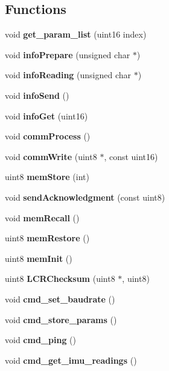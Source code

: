\subsection*{Functions}
\begin{DoxyCompactItemize}
\item 
\mbox{\label{command__processing_8h_a5ef086c932682ca5f7549b74ead732aa}} 
void {\bfseries get\+\_\+param\+\_\+list} (uint16 index)
\item 
\mbox{\label{command__processing_8h_a6fda7bc0be24d261f9cb09e77616b1be}} 
void {\bfseries info\+Prepare} (unsigned char $\ast$)
\item 
\mbox{\label{command__processing_8h_a065ff61e3097bf916aea076a8decb92b}} 
void {\bfseries info\+Reading} (unsigned char $\ast$)
\item 
\mbox{\label{command__processing_8h_af5dcf9e6d2a6421fbe636487e7f9f240}} 
void {\bfseries info\+Send} ()
\item 
\mbox{\label{command__processing_8h_a813734e69ea461791f84bddee422013f}} 
void {\bfseries info\+Get} (uint16)
\item 
\mbox{\label{command__processing_8h_a2e5d1711e19837adc3e8f479af3ae509}} 
void {\bfseries comm\+Process} ()
\item 
\mbox{\label{command__processing_8h_adeaad7a3965fdcfe78aa89533f1ebf39}} 
void {\bfseries comm\+Write} (uint8 $\ast$, const uint16)
\item 
uint8 \textbf{ mem\+Store} (int)
\item 
\mbox{\label{command__processing_8h_afe5c87f9df9bb965976b5d40c4159f1f}} 
void {\bfseries send\+Acknowledgment} (const uint8)
\item 
void \textbf{ mem\+Recall} ()
\item 
uint8 \textbf{ mem\+Restore} ()
\item 
uint8 \textbf{ mem\+Init} ()
\item 
\mbox{\label{command__processing_8h_a6e19f1d501b0105e925c376d93f06a70}} 
uint8 {\bfseries L\+C\+R\+Checksum} (uint8 $\ast$, uint8)
\item 
void \textbf{ cmd\+\_\+set\+\_\+baudrate} ()
\item 
\mbox{\label{command__processing_8h_a1a2493bfc2f30171d7e7a3bd5aebab14}} 
void {\bfseries cmd\+\_\+store\+\_\+params} ()
\item 
\mbox{\label{command__processing_8h_a704f8c8cb0f4d75f243fc2b79bc34188}} 
void {\bfseries cmd\+\_\+ping} ()
\item 
\mbox{\label{command__processing_8h_a40f7c67690279132ab72019b76165cb8}} 
void {\bfseries cmd\+\_\+get\+\_\+imu\+\_\+readings} ()
\end{DoxyCompactItemize}


